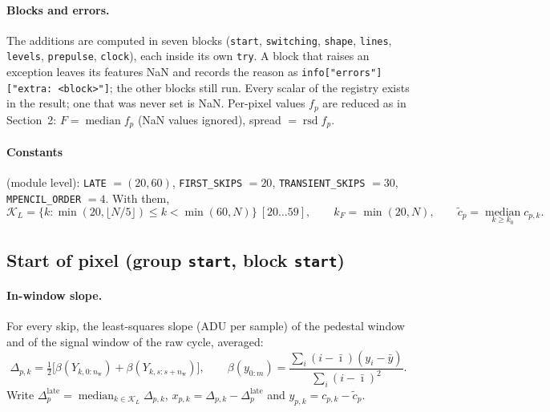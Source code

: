 \documentclass[10pt]{article}
\newcommand{\code}[1]{\texttt{#1}}
\newcommand{\med}{\operatorname*{median}}
\newcommand{\rsd}{\operatorname{rsd}}
\newcommand{\nw}{n_\text{w}}
\newcommand{\ko}{k_0}
\begin{document}
\paragraph{Blocks and errors.} The additions are computed in seven blocks (\code{start}, \code{switching}, \code{shape}, \code{lines},
\code{levels}, \code{prepulse}, \code{clock}), each inside its own \code{try}. A block that raises an exception leaves its features
NaN and records the reason as \code{info["errors"]["extra: <block>"]}; the other blocks still run. Every scalar of the registry
exists in the result; one that was never set is NaN. Per-pixel values $f_p$ are reduced as in Section~2: $F = \med f_p$ (NaN values
ignored), spread $= \rsd f_p$.

\paragraph{Constants} (module level): \code{LATE} $= (20, 60)$, \code{FIRST\_SKIPS} $= 20$, \code{TRANSIENT\_SKIPS} $= 30$,
\code{MPENCIL\_ORDER} $= 4$. With them,
\begin{equation}
\mathcal K_L = \{k : \min(20, \lfloor N/5\rfloor) \le k < \min(60, N)\}\ [20\dots59],\qquad k_F = \min(20, N),\qquad
\tilde c_p = \med_{k \ge \ko} c_{p,k}.
\end{equation}

\subsection{Start of pixel (group \code{start}, block \code{start})}

\paragraph{In-window slope.} For every skip, the least-squares slope (ADU per sample) of the pedestal window and of the signal window
of the raw cycle, averaged:
\begin{equation}
\Delta_{p,k} = \tfrac12\bigl[\beta(Y_{k,0:\nw}) + \beta(Y_{k,s:s+\nw})\bigr],\qquad
\beta(y_{0:m}) = \frac{\sum_i (i - \bar\imath)(y_i - \bar y)}{\sum_i (i - \bar\imath)^2}.
\end{equation}
Write $\Delta^\text{late}_p = \med_{k \in \mathcal K_L}\Delta_{p,k}$, $x_{p,k} = \Delta_{p,k} - \Delta^\text{late}_p$ and
$y_{p,k} = c_{p,k} - \tilde c_p$.
\end{document}
